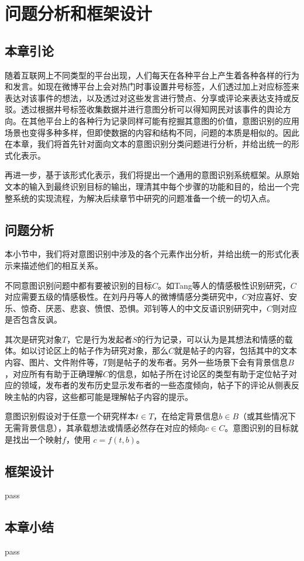 \chapter{问题分析和框架设计}
\label{cha:problem_framework}

\section{本章引论}

随着互联网上不同类型的平台出现，人们每天在各种平台上产生着各种各样的行为和发言。如现在微博平台上会对热门时事设置井号标签，人们透过加上对应标签来表达对该事件的想法，以及透过对这些发言进行赞点、分享或评论来表达支持或反驳。透过根据井号标签收集数据并进行意图分析可以得知网民对该事件的舆论方向。在其他平台上的各种行为记录同样可能有挖掘其意图的价值，意图识别的应用场景也变得多种多样，但即使数据的内容和结构不同，问题的本质是相似的。因此在本章，我们将首先针对面向文本的意图识别分类问题进行分析，并给出统一的形式化表示。

再进一步，基于该形式化表示，我们将提出一个通用的意图识别系统框架。从原始文本的输入到最终识别目标的输出，理清其中每个步骤的功能和目的，给出一个完整系统的实现流程，为解决后续章节中研究的问题准备一个统一的切入点。


\section{问题分析}

本小节中，我们将对意图识别中涉及的各个元素作出分析，并给出统一的形式化表示来描述他们的相互关系。

不同意图识别问题中都有要被识别的目标$C$。如Tang等人\cite{tang2015learning}的情感极性识别研究，$C$对应需要五级的情感极性。在刘丹丹等人\cite{刘丹丹2015基于}的微博情感分类研究中，$C$对应喜好、安乐、惊奇、厌恶、悲哀、愤恨、恐惧。邓钊等人\cite{2015面向微博的中文反语识别研究}的中文反语识别研究中，$C$则对应是否包含反讽。

其次是研究对象$T$，它是行为发起者$S$的行为记录，可以认为是其想法和情感的载体。如以讨论区上的帖子作为研究对象，那么$C$就是帖子的内容，包括其中的文本内容、图片、文件附件等，$T$则是帖子的发布者。另外一些场景下会有背景信息$B$，对应所有有助于正确理解$C$的信息，如帖子所在讨论区的类型有助于定位帖子对应的领域，发布者的发布历史显示发布者的一些态度倾向，帖子下的评论从侧表反映主帖的内容，这些都可能是理解帖子内容的提示。

意图识别假设对于任意一个研究样本$t \in T$，在给定背景信息$b \in B$（或其些情况下无需背景信息），其承载想法或情感必然存在对应的倾向$c \in C$。意图识别的目标就是找出一个映射$f$，使用 $c=f(t, b)$。

\section{框架设计}

pass

\section{本章小结}

pass


